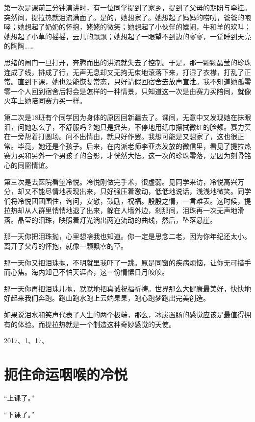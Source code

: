 \documentclass[openany]{ctexbook}
\begin{document}
第一次是课前三分钟演讲时，有一位同学提到了家乡，提到了父母的期盼与牵挂。突然间，提拉热就泪流满面了。是的，她想家了。她想起了妈妈的唠叨，爸爸的咆哮；她想起了奶奶的怀抱，姥姥的微笑；她想起了小伙伴的嬉闹，牛和羊的欢叫；她想起了小草的摇摇，云儿的飘飘；她想起了一眼望不到边的寥寥，一觉睡到天亮的陶陶\ldots{}\ldots{}

思绪的闸门一旦打开，奔腾而出的洪流就失去了控制。于是，那一颗颗晶莹的珍珠连成了线，排成了行，无声无息却又无拘无束地滚落下来，打湿了衣襟，打乱了正常。直到下课，她也没能恢复常态，只好请假回宿舍去放声宣泄。我不知道她孤零零一个人回到宿舍后将会是怎样的一种情景，只知道这一次是由赛力买陪同，就像火车上她陪同赛力买一样。

第二次是18班有个同学因为身体的原因回新疆去了。课间，无意中又发现她在抹眼泪，问她怎么了，不舒服吗？她只是摇头，不停地用纸巾擦拭微红的脸颊。赛力买在一旁帮着打圆场。问不出情由，就只好作罢。我想可能是又想家了，这也很正常。毕竟，她还是个孩子。后来，在内派老师李亚杰发放的微信里，看见了提拉热赛力买和另外一个男孩子的合影，才恍然大悟。这一次的珍珠零落，是因为刻骨铭心的同窗情谊。

第三次是去医院看望冷悦。冷悦刚做完手术，很虚弱。见同学来访，冷悦高兴万分，却又不能尽情地表现出来，只好强压着激动，低低地说话，浅浅地微笑。同学们将冷悦团团围住，询问，安慰，鼓励，祝福。殷殷之情，一言难表。这时候，提拉热却从人群里悄悄地退了出来，躲在人墙外边，刹那间，泪珠再一次无声地滑落。晶莹的泪珠，映照着灯光淌出两道流动的曲线，然后，坠落悬崖。

那一天你把泪珠抛，心里想啥我也知道。你一定是思念二老，因为你年纪还太小。离开了父母的怀抱，就像一颗飘零的草。

那一天你又把泪珠抛，不明就里我吓了一跳。原是同窗的疾病烦恼，让你无可措手而心焦。海内知己不怕天涯杳，这一份情愫日月皎皎。

那一天你再把泪珠儿抛，默默地把真诚祝福祈祷。世界那么大健康最美好，快快地好起来我们奔跑。跑山跑水跑上云端杲杲，跑心跑梦跑出完美创造。

如果说泪水和笑声代表了人生的两个极端，那么，冰炭置肠的感觉应该是最值得拥有的体验。而提拉热就是一个制造这种奇妙感觉的天使。

2017、1、17、

\chapter*{扼住命运咽喉的冷悦}\label{lengyue}

``上课了。''

``下课了。''
\end{document}
